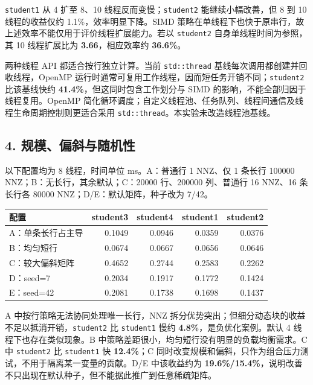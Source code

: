 \documentclass[
  10pt,
  a4paper,
]{article}
\begin{document}
\texttt{student1} 从 4 扩至 8、10 线程反而变慢；\texttt{student2}
能继续小幅改善，但 8 到 10 线程的收益仅约 1.1\%，效率明显下降。SIMD
策略在单线程下也快于原串行，故上述效率不能仅用于评价线程扩展能力。若以
\texttt{student2} 自身单线程时间为参照，其 10 线程扩展比为
\textbf{3.66}，相应效率约 \textbf{36.6\%}。

两种线程 API 都适合按行独立计算。当前 \texttt{std::thread}
基线每次调用都创建并回收线程，OpenMP
运行时通常可复用工作线程，因而短任务开销不同；\texttt{student2}
比该基线快约 \textbf{41.4\%}，但这同时包含工作划分与 SIMD
的影响，不能全部归因于线程复用。OpenMP
简化循环调度；自定义线程池、任务队列、线程间通信及线程生命周期控制则更适合采用
\texttt{std::thread}。本实验未改造线程池基线。

\newpage

\subsection{4.
规模、偏斜与随机性}\label{ux89c4ux6a21ux504fux659cux4e0eux968fux673aux6027}

以下配置均为 8 线程，时间单位 ms。A：普通行 1 NNZ、仅 1 条长行 100000
NNZ；B：无长行，其余默认；C：20000 行、200000 列、普通行 16 NNZ、16
条长行各 80000 NNZ；D/E：默认矩阵，种子改为 7/42。

\begin{longtable}[]{@{}lrrrr@{}}
\toprule\noalign{}
配置 & student3 & student4 & student1 & student2 \\
\midrule\noalign{}
\endhead
\bottomrule\noalign{}
\endlastfoot
A：单条长行占主导 & 0.1049 & 0.0946 & 0.0359 & 0.0376 \\
B：均匀短行 & 0.0674 & 0.0667 & 0.0656 & 0.0646 \\
C：较大偏斜矩阵 & 0.4652 & 0.2744 & 0.2583 & 0.2262 \\
D：seed=7 & 0.2034 & 0.1917 & 0.1772 & 0.1424 \\
E：seed=42 & 0.2081 & 0.1738 & 0.1698 & 0.1437 \\
\end{longtable}

A 中按行策略无法协同处理唯一长行，NNZ
拆分优势突出；但细分动态块的收益不足以抵消开销，\texttt{student2} 比
\texttt{student1} 慢约 \textbf{4.8\%}，是负优化案例。默认 4
线程下也存在类似现象。B
中策略差距很小，均匀短行没有明显的负载均衡需求。C 中 \texttt{student2}
比 \texttt{student1} 快 \textbf{12.4\%}；C
同时改变规模和偏斜，只作为组合压力测试，不用于隔离某一变量的贡献。D/E
中该收益约为
\textbf{19.6\%/15.4\%}，说明改善不只出现在默认种子，但不能据此推广到任意稀疏矩阵。
\end{document}
